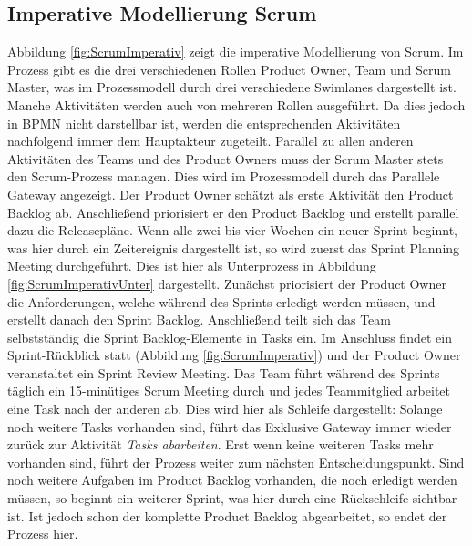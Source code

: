 \subsection{Imperative Modellierung Scrum}

Abbildung \ref{fig:ScrumImperativ} zeigt die imperative Modellierung von Scrum. Im Prozess gibt es die drei verschiedenen Rollen Product Owner, Team und Scrum Master, was im Prozessmodell durch drei verschiedene Swimlanes dargestellt ist. Manche Aktivitäten werden auch von mehreren Rollen ausgeführt. Da dies jedoch in BPMN nicht darstellbar ist, werden die entsprechenden Aktivitäten nachfolgend immer dem Hauptakteur zugeteilt.\newline
Parallel zu allen anderen Aktivitäten des Teams und des Product Owners muss der Scrum Master stets den Scrum-Prozess managen. Dies wird im Prozessmodell durch das Parallele Gateway angezeigt. \newline
Der Product Owner schätzt als erste Aktivität den Product Backlog ab. Anschließend priorisiert er den Product Backlog und erstellt parallel dazu die Releasepläne. \newline
Wenn alle zwei bis vier Wochen ein neuer Sprint beginnt, was hier durch ein Zeitereignis dargestellt ist, so wird zuerst das Sprint Planning Meeting durchgeführt. Dies ist hier als Unterprozess in Abbildung \ref{fig:ScrumImperativUnter} dargestellt. Zunächst priorisiert der Product Owner die Anforderungen, welche während des Sprints erledigt werden müssen, und erstellt danach den Sprint Backlog. Anschließend teilt sich das Team selbstständig die Sprint Backlog-Elemente in Tasks ein.\newline
Im Anschluss findet ein Sprint-Rückblick statt (Abbildung \ref{fig:ScrumImperativ}) und der Product Owner veranstaltet ein Sprint Review Meeting.\newline
Das Team führt während des Sprints täglich ein 15-minütiges Scrum Meeting durch und jedes Teammitglied arbeitet eine Task nach der anderen ab. Dies wird hier als Schleife dargestellt: Solange noch weitere Tasks vorhanden sind, führt das Exklusive Gateway immer wieder zurück zur Aktivität \textit{Tasks abarbeiten}. Erst wenn keine weiteren Tasks mehr vorhanden sind, führt der Prozess weiter zum nächsten Entscheidungspunkt.\newline
Sind noch weitere Aufgaben im Product Backlog vorhanden, die noch erledigt werden müssen, so beginnt ein weiterer Sprint, was hier durch eine Rückschleife sichtbar ist. Ist jedoch schon der komplette Product Backlog abgearbeitet, so endet der Prozess hier.


